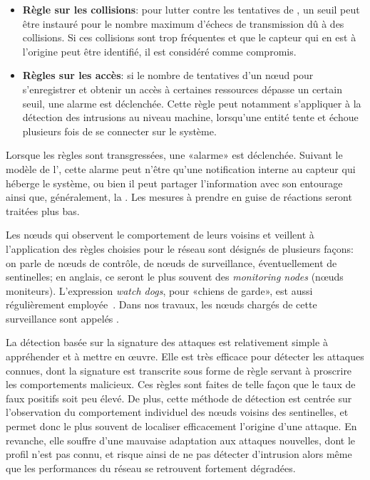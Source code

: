 \begin{itemize}
    \item \textbf{Règle sur les collisions}: pour lutter contre les tentatives de , un seuil peut être instauré pour le nombre maximum d'échecs de transmission dû à des collisions. Si ces collisions sont trop fréquentes et que le capteur qui en est à l'origine peut être identifié, il est considéré comme compromis.
    \item \textbf{Règles sur les accès}: si le nombre de tentatives d'un nœud pour s'enregistrer et obtenir un accès à certaines ressources dépasse un certain seuil, une alarme est déclenchée. Cette règle peut notamment s'appliquer à la détection des intrusions au niveau machine, lorsqu'une entité tente et échoue plusieurs fois de se connecter sur le système.
\end{itemize}

Lorsque les règles sont transgressées, une «alarme» est déclenchée.
Suivant le modèle de l'\IDS, cette alarme peut n'être qu'une notification interne au capteur qui héberge le système, ou bien il peut partager l'information avec son entourage ainsi que, généralement, la \sdb.
Les mesures à prendre en guise de réactions seront traitées plus bas.

Les nœuds qui observent le comportement de leurs voisins et veillent à l'application des règles choisies pour le réseau sont désignés de plusieurs façons: on parle de nœuds de contrôle, de nœuds de surveillance, éventuellement de sentinelles; en anglais, ce seront le plus souvent des \textit{monitoring nodes} (nœuds moniteurs).
L'expression \textit{watch dogs}, pour «chiens de garde», est aussi régulièrement employée~\cite{RKKK13}.
Dans nos travaux, les nœuds chargés de cette surveillance sont appelés \cns.

La détection basée sur la signature des attaques est relativement simple à appréhender et à mettre en œuvre.
Elle est très efficace pour détecter les attaques connues, dont la signature est transcrite sous forme de règle servant à proscrire les comportements malicieux.
Ces règles sont faites de telle façon que le taux de faux positifs soit peu élevé.
De plus, cette méthode de détection est centrée sur l'observation du comportement individuel des nœuds voisins des sentinelles, et permet donc le plus souvent de localiser efficacement l'origine d'une attaque.
En revanche, elle souffre d'une mauvaise adaptation aux attaques nouvelles, dont le profil n'est pas connu, et risque ainsi de ne pas détecter d'intrusion alors même que les performances du réseau se retrouvent fortement dégradées.

